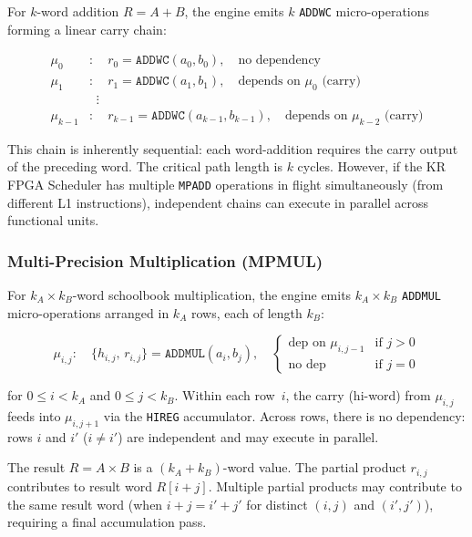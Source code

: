 \documentclass[11pt,a4paper]{article}
\begin{document}
For $k$-word addition $R = A + B$, the engine emits $k$ \texttt{ADDWC}
micro-operations forming a linear carry chain:

\begin{equation}
\label{eq:mpadd-chain}
\begin{aligned}
\mu_0 &: \quad r_0 = \mathtt{ADDWC}(a_0, b_0), \quad \text{no dependency} \\
\mu_1 &: \quad r_1 = \mathtt{ADDWC}(a_1, b_1), \quad \text{depends on } \mu_0 \text{ (carry)} \\
      &\;\;\vdots \\
\mu_{k-1} &: \quad r_{k-1} = \mathtt{ADDWC}(a_{k-1}, b_{k-1}), \quad \text{depends on } \mu_{k-2} \text{ (carry)}
\end{aligned}
\end{equation}

This chain is inherently sequential: each word-addition requires the carry
output of the preceding word.  The critical path length is $k$ cycles.
However, if the KR FPGA Scheduler has multiple \texttt{MPADD} operations in
flight simultaneously (from different L1 instructions), independent chains
can execute in parallel across functional units.

\subsubsection{Multi-Precision Multiplication (MPMUL)}

For $k_A \times k_B$-word schoolbook multiplication, the engine emits
$k_A \times k_B$ \texttt{ADDMUL} micro-operations arranged in $k_A$ rows,
each of length $k_B$:

\begin{equation}
\label{eq:mpmul-decomp}
\mu_{i,j} : \quad \{h_{i,j},\, r_{i,j}\} = \mathtt{ADDMUL}(a_i, b_j), \quad
  \begin{cases}
    \text{dep on } \mu_{i,j-1} & \text{if } j > 0 \\
    \text{no dep} & \text{if } j = 0
  \end{cases}
\end{equation}

for $0 \le i < k_A$ and $0 \le j < k_B$.  Within each row~$i$, the carry
(hi-word) from $\mu_{i,j}$ feeds into $\mu_{i,j+1}$ via the \texttt{HIREG}
accumulator.  Across rows, there is no dependency: rows $i$ and $i'$ ($i \ne i'$)
are independent and may execute in parallel.

The result $R = A \times B$ is a $(k_A + k_B)$-word value.  The partial product
$r_{i,j}$ contributes to result word $R[i+j]$.  Multiple partial products
may contribute to the same result word (when $i + j = i' + j'$ for distinct
$(i,j)$ and $(i',j')$), requiring a final accumulation pass.
\end{document}
